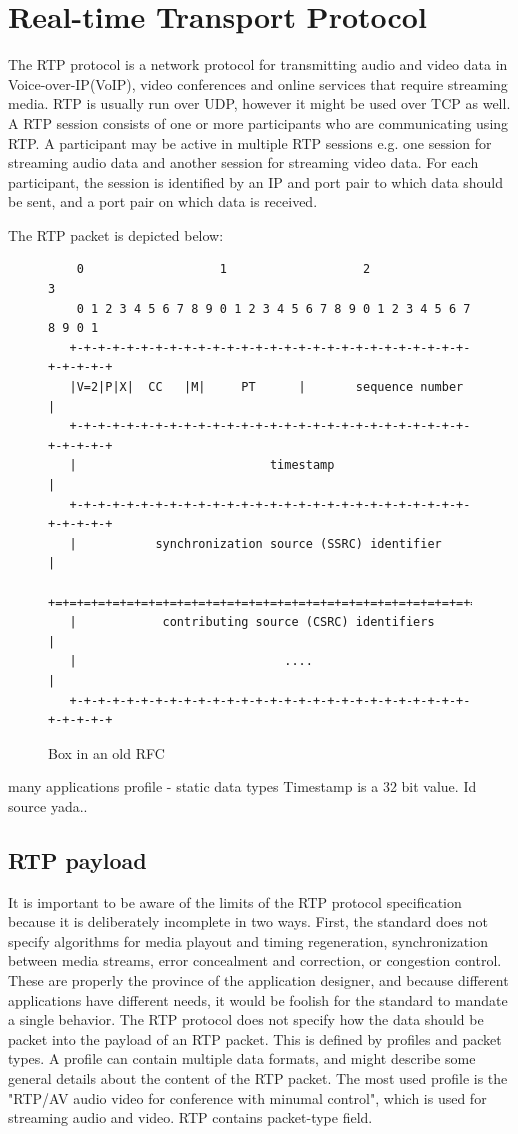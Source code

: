 \section{Real-time Transport Protocol}
The RTP protocol is a network protocol for transmitting audio and video data in Voice-over-IP(VoIP), video conferences and online services that require streaming media. RTP is usually run over UDP, however it might be used over TCP as well.
A RTP session consists of one or more participants who are communicating using RTP. A participant may be active in multiple RTP sessions e.g. one session for streaming audio data and another session for streaming video data. For each participant, the session is identified by an IP and port pair to which data should be sent, and a port pair on which data is received. 

The RTP packet is depicted below:

\begin{figure}[h!]
\begin{verbatim}
    0                   1                   2                   3
    0 1 2 3 4 5 6 7 8 9 0 1 2 3 4 5 6 7 8 9 0 1 2 3 4 5 6 7 8 9 0 1
   +-+-+-+-+-+-+-+-+-+-+-+-+-+-+-+-+-+-+-+-+-+-+-+-+-+-+-+-+-+-+-+-+
   |V=2|P|X|  CC   |M|     PT      |       sequence number         |
   +-+-+-+-+-+-+-+-+-+-+-+-+-+-+-+-+-+-+-+-+-+-+-+-+-+-+-+-+-+-+-+-+
   |                           timestamp                           |
   +-+-+-+-+-+-+-+-+-+-+-+-+-+-+-+-+-+-+-+-+-+-+-+-+-+-+-+-+-+-+-+-+
   |           synchronization source (SSRC) identifier            |
   +=+=+=+=+=+=+=+=+=+=+=+=+=+=+=+=+=+=+=+=+=+=+=+=+=+=+=+=+=+=+=+=+
   |            contributing source (CSRC) identifiers             |
   |                             ....                              |
   +-+-+-+-+-+-+-+-+-+-+-+-+-+-+-+-+-+-+-+-+-+-+-+-+-+-+-+-+-+-+-+-+
\end{verbatim}
\caption{Box in an old RFC}
\label{fig:ascii-box}
\end{figure}

many applications
profile
 - static
data types
Timestamp is a 32 bit value.
Id
source
yada..

\subsection{RTP payload}

It is important to be aware of the limits of the RTP protocol specification because it is deliberately incomplete in two ways. First, the standard does not specify algorithms for media playout and timing regeneration, synchronization between media streams, error concealment and correction, or congestion control. These are properly the province of the application designer, and because different applications have different needs, it would be foolish for the standard to mandate a single behavior.
The RTP protocol does not specify how the data should be packet into the payload of an RTP packet. This is defined by profiles and packet types. A profile can contain multiple data formats, and might describe some general details about the content of the RTP packet.
The most used profile is the "RTP/AV audio video for conference with minumal control", which is used for streaming audio and video.
RTP contains packet-type field.

